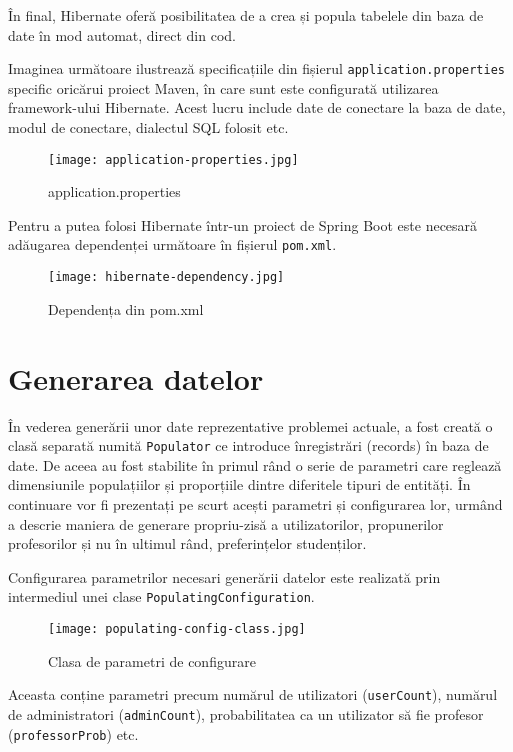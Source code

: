 În final, Hibernate oferă posibilitatea de a crea și popula tabelele din baza de date în mod automat, direct din cod.

Imaginea următoare ilustrează specificațiile din fișierul \texttt{application.properties} specific oricărui proiect Maven, în care sunt este configurată utilizarea framework-ului Hibernate. Acest lucru include date de conectare la baza de date, modul de conectare, dialectul SQL folosit etc.

\begin{figure}[H]
	\centering
	\texttt{[image: application-properties.jpg]}
	\caption{application.properties}
\end{figure}

Pentru a putea folosi Hibernate într-un proiect de Spring Boot este necesară adăugarea dependenței următoare în fișierul \texttt{pom.xml}.

\begin{figure}[H]
	\centering
	\texttt{[image: hibernate-dependency.jpg]}
	\caption{Dependența din pom.xml}
\end{figure}

\section{Generarea datelor}

În vederea generării unor date reprezentative problemei actuale, a fost creată o clasă separată numită \texttt{Populator} ce introduce înregistrări (records) în baza de date. De aceea au fost stabilite în primul rând o serie de parametri care reglează dimensiunile populațiilor și proporțiile dintre diferitele tipuri de entități. În continuare vor fi prezentați pe scurt acești parametri și configurarea lor, urmând a descrie maniera de generare propriu-zisă a utilizatorilor, propunerilor profesorilor și nu în ultimul rând, preferințelor studenților.

Configurarea parametrilor necesari generării datelor este realizată prin intermediul unei clase \texttt{PopulatingConfiguration}.

\begin{figure}[H]
	\centering
	\texttt{[image: populating-config-class.jpg]}
	\caption{Clasa de parametri de configurare}
\end{figure}

Aceasta conține parametri precum numărul de utilizatori (\texttt{userCount}), numărul de administratori (\texttt{adminCount}), probabilitatea ca un utilizator să fie profesor 
(\texttt{professorProb}) etc.

